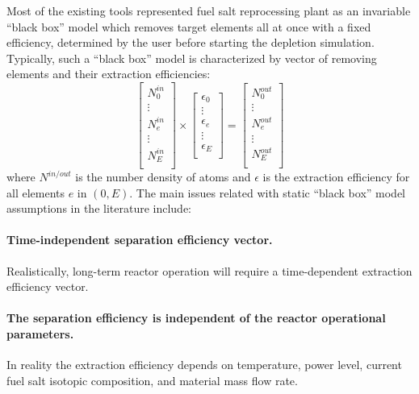 Most of the existing tools represented fuel salt reprocessing plant as an 
invariable ``black box'' model which removes target elements all at once with 
a fixed efficiency, determined by the user before starting the depletion 
simulation. Typically, such a ``black box'' model is characterized by vector of  
removing elements and their extraction efficiencies:
\begin{equation}
\begin{bmatrix}
N^{in}_{0} \\ \vdots \\ N^{in}_{e} \\ \vdots \\ N^{in}_{E} \\
\end{bmatrix} 
\times
\begin{bmatrix}
\epsilon_{0} \\ \vdots \\ \epsilon_{e} \\ \vdots \\ \epsilon_{E} \\
\end{bmatrix} =
\begin{bmatrix}
N^{out}_{0}\\ \vdots \\ N^{out}_{e} \\ \vdots \\N^{out}_{E}  \\
\end{bmatrix}
\end{equation}
where $N^{in/out}$ is the number density of atoms and $\epsilon$ is the 
extraction efficiency for all elements $e$ in $(0, E)$. The main issues 
related with static ``black box'' model assumptions in the literature include: 
\paragraph{Time-independent separation efficiency vector.} Realistically, 
	long-term reactor operation will require a time-dependent extraction 
	efficiency vector.
\paragraph{The separation efficiency is independent of the reactor operational 
	parameters.} In reality the extraction efficiency depends on temperature, 
	power level, current fuel salt isotopic composition, and material mass 
	flow rate.
